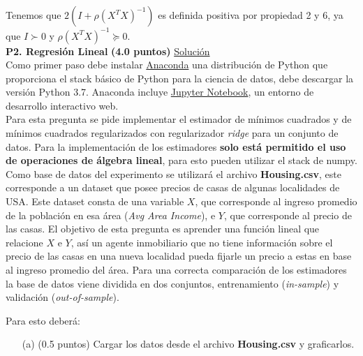 \documentclass[11pt,letterpaper]{article}
\begin{document}
\begin{itemize}
Tenemos que $2(I+\rho(X^{T}X)^{-1})$ es definida positiva por propiedad 2 y 6, ya que $I\succ0$ y $\rho(X^{T}X)^{-1}\succeq0$. \\

\newpage
\vspace{5 mm}
\noindent\textbf{P2. Regresión Lineal} \textbf{(4.0 puntos)}
\vspace{5 mm}
\href{https://nbviewer.jupyter.org/github/dgarridoa/T1ML/blob/master/solucion.ipynb}{Solución}\\

Como primer paso debe instalar \href{https://www.anaconda.com/distribution/}{Anaconda} una distribución de Python que proporciona el stack básico de Python para la ciencia de datos, debe descargar la versión Python 3.7. Anaconda incluye  \href{https://jupyter.org/}{Jupyter Notebook}, un entorno de desarrollo interactivo web.\\

Para esta pregunta se pide implementar el estimador de mínimos cuadrados y de mínimos cuadrados regularizados con regularizador \textit{ridge} para un conjunto de datos. Para la implementación de los estimadores \textbf{solo está permitido el uso de operaciones de álgebra lineal}, para esto pueden utilizar el stack de numpy.\\

Como base de datos del experimento se utilizará el archivo \textbf{Housing.csv}, este corresponde a un dataset que posee precios de casas de algunas localidades de USA. Este dataset consta de  una variable $X$, que corresponde al ingreso promedio de la población en esa área (\textit{Avg Area Income}), e $Y$, que corresponde al precio de las casas. El objetivo de esta pregunta es aprender una función lineal que relacione $X$ e $Y$, así un agente inmobiliario que no tiene información sobre el precio de las casas en una nueva localidad pueda fijarle un precio a estas en base al ingreso promedio del área. Para una correcta comparación de los estimadores la base de datos viene dividida en dos conjuntos, entrenamiento (\textit{in-sample}) y validación (\textit{out-of-sample}).

Para esto deberá:

\begin{itemize}
	\item[(a)] (0.5 puntos) Cargar los datos desde el archivo \textbf{Housing.csv} y graficarlos.\\
	

\end{itemize}
\end{itemize}
\end{document}
